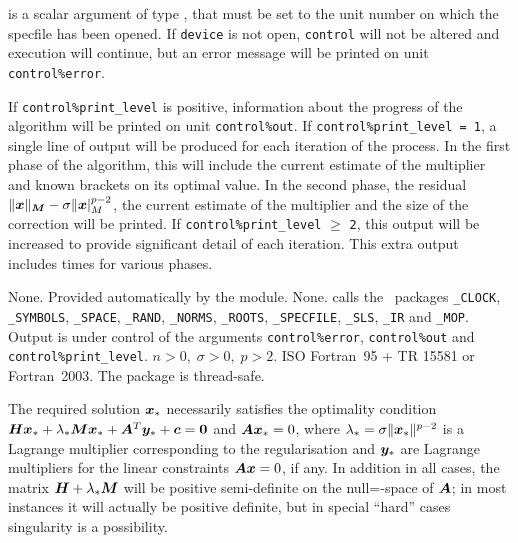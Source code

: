 \documentclass{galahad}
\newcommand{\packagename}{RQS}
\begin{document}
\begin{description}

 is a scalar \intentin argument of type \integer,
that must be set to the unit number on which the specfile
has been opened. If {\tt device} is not open, {\tt control} will
not be altered and execution will continue, but an error message
will be printed on unit {\tt control\%error}.

\end{description}


\galinfo
If {\tt control\%print\_level} is positive, information about the progress
of the algorithm will be printed on unit {\tt control\-\%\-out}.
If {\tt control\%print\_level = 1}, a single line of output will be produced
for each iteration of the process. In the first phase of the algorithm,
this will include the current estimate of the multiplier and known
brackets on its optimal value. In the second phase, the residual
$\|{\bm{x}}\|_{{\bm{M}}} - \sigma \|{\bm{x}}|_M^{p-2}$,
the current estimate of the multiplier and
the size of the correction will be printed.
If {\tt control\%print\_level} $\geq$ {\tt 2}, this
output will be increased to provide significant detail of each iteration.
This extra output includes times for various phases.


\galgeneral

\galcommon None.
\galworkspace Provided automatically by the module.
\galroutines None.
\galmodules {\tt \packagename\_solve} calls the \galahad\ packages
{\tt \libraryname\_CLOCK},
{\tt \libraryname\_SY\-M\-BOLS},
{\tt \libraryname\_\-SPACE},
{\tt \libraryname\-\_\-RAND},
{\tt \libraryname\_\-NORMS},
{\tt \libraryname\_\-ROOTS},
{\tt \libraryname\_SPECFILE},
{\tt \libraryname\_SLS},
{\tt \libraryname\_IR}
and
{\tt \libraryname\_MOP}.
\galio Output is under control of the arguments
{\tt control\%error}, {\tt control\%out} and {\tt control\%print\_level}.
\galrestrictions $n  >  0, \;  \sigma  >  0, \; p > 2$.
\galportability ISO Fortran~95 + TR 15581 or Fortran~2003.
The package is thread-safe.


\galmethod
The required solution ${\bm{x}}_*$ necessarily satisfies the optimality condition
${\bm{H}} {\bm{x}}_* + \lambda_* {\bm{M}} {\bm{x}}_* + {\bm{A}}^T {\bm{y}}_* + {\bm{c}} = {\bm{0}}$ and
${\bm{A}} {\bm{x}}_* = 0$, where
$\lambda_* = \sigma \|{\bm{x}}_*\|^{p-2}$
is a Lagrange multiplier corresponding to the regularisation
and ${\bm{y}}_*$ are Lagrange multipliers for the linear constraints 
${\bm{A}} {\bm{x}} = 0$, if any.
In addition in all cases, the matrix ${\bm{H}} + \lambda_* {\bm{M}}$ will be positive
semi-definite on the null=-space of ${\bm{A}}$; in most instances it will actually
be positive definite, but in special ``hard'' cases singularity is 
a possibility.
\end{document}
